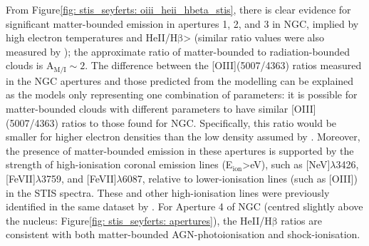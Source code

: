 From Figure\;\ref{fig: stis_seyferts: oiii_heii_hbeta_stis}, there is clear evidence for significant matter-bounded emission in apertures 1, 2, and 3 in NGC, implied by high electron temperatures and HeII/H$\mathrm{\beta}$\;\textgreater{} (similar ratio values were also measured by \citealt{Kraemer2000III}); the approximate ratio of matter-bounded to radiation-bounded clouds is A$_\mathrm{M/I}\sim2$. The difference between the [OIII](5007/4363) ratios measured in the NGC apertures and those predicted from the \citet{Binette1996} modelling can be explained as the models only representing one combination of parameters: it is possible for matter-bounded clouds with different parameters to have similar [OIII](5007/4363) ratios to those found for NGC. Specifically, this ratio would be smaller for higher electron densities than the low density assumed by \citet{Binette1996}. Moreover, the presence of matter-bounded emission in these apertures is supported by the strength of high-ionisation coronal emission lines (E$_\mathrm{ion}$\;\textgreater{}\;eV), such as [NeV]$\lambda$3426, [FeVII]$\lambda$3759, and [FeVII]$\lambda$6087, relative to lower-ionisation lines (such as [OIII]) in the STIS spectra. These and other high-ionisation lines were previously identified in the same dataset by \citet{Kraemer2000II}. For Aperture 4 of NGC (centred slightly above the nucleus: Figure\;\ref{fig: stis_seyferts: apertures}), the  HeII/H$\mathrm{\beta}$ ratios are consistent with both matter-bounded AGN-photoionisation and shock-ionisation. 

